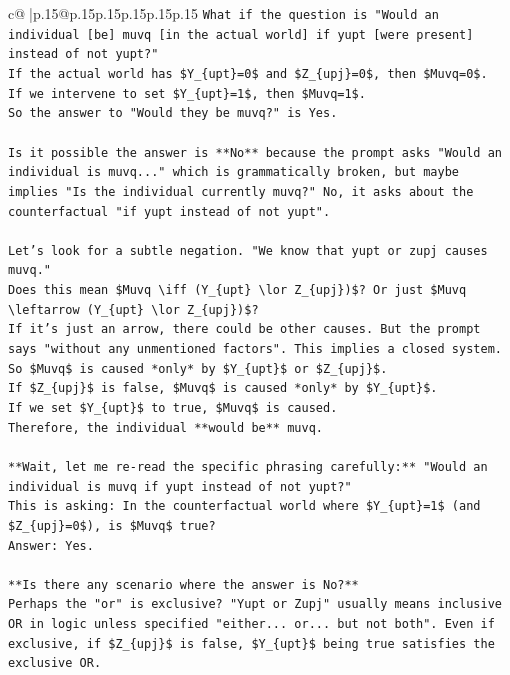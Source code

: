 \documentclass{article}
\begin{document}
{\begin{supertabular}{c@{$\;$}|p{.15\linewidth}@{}p{.15\linewidth}p{.15\linewidth}p{.15\linewidth}p{.15\linewidth}p{.15\linewidth}}
{{{\texttt{What if the question is "Would an individual {[}be{]} muvq {[}in the actual world{]} if yupt {[}were present{]} instead of not yupt?"} \\
\texttt{If the actual world has \$Y\_\{upt\}=0\$ and \$Z\_\{upj\}=0\$, then \$Muvq=0\$.} \\
\texttt{If we intervene to set \$Y\_\{upt\}=1\$, then \$Muvq=1\$.} \\
\texttt{So the answer to "Would they be muvq?" is Yes.} \\
\\ 
\texttt{Is it possible the answer is **No** because the prompt asks "Would an individual is muvq..." which is grammatically broken, but maybe implies "Is the individual currently muvq?" No, it asks about the counterfactual "if yupt instead of not yupt".} \\
\\ 
\texttt{Let's look for a subtle negation. "We know that yupt or zupj causes muvq."} \\
\texttt{Does this mean \$Muvq \textbackslash{}iff (Y\_\{upt\} \textbackslash{}lor Z\_\{upj\})\$? Or just \$Muvq \textbackslash{}leftarrow (Y\_\{upt\} \textbackslash{}lor Z\_\{upj\})\$?} \\
\texttt{If it's just an arrow, there could be other causes. But the prompt says "without any unmentioned factors". This implies a closed system.} \\
\texttt{So \$Muvq\$ is caused *only* by \$Y\_\{upt\}\$ or \$Z\_\{upj\}\$.} \\
\texttt{If \$Z\_\{upj\}\$ is false, \$Muvq\$ is caused *only* by \$Y\_\{upt\}\$.} \\
\texttt{If we set \$Y\_\{upt\}\$ to true, \$Muvq\$ is caused.} \\
\texttt{Therefore, the individual **would be** muvq.} \\
\\ 
\texttt{**Wait, let me re{-}read the specific phrasing carefully:** "Would an individual is muvq if yupt instead of not yupt?"} \\
\texttt{This is asking: In the counterfactual world where \$Y\_\{upt\}=1\$ (and \$Z\_\{upj\}=0\$), is \$Muvq\$ true?} \\
\texttt{Answer: Yes.} \\
\\ 
\texttt{**Is there any scenario where the answer is No?**} \\
\texttt{Perhaps the "or" is exclusive? "Yupt or Zupj" usually means inclusive OR in logic unless specified "either... or... but not both". Even if exclusive, if \$Z\_\{upj\}\$ is false, \$Y\_\{upt\}\$ being true satisfies the exclusive OR.} \\
}}}
\end{supertabular}}
\end{document}
